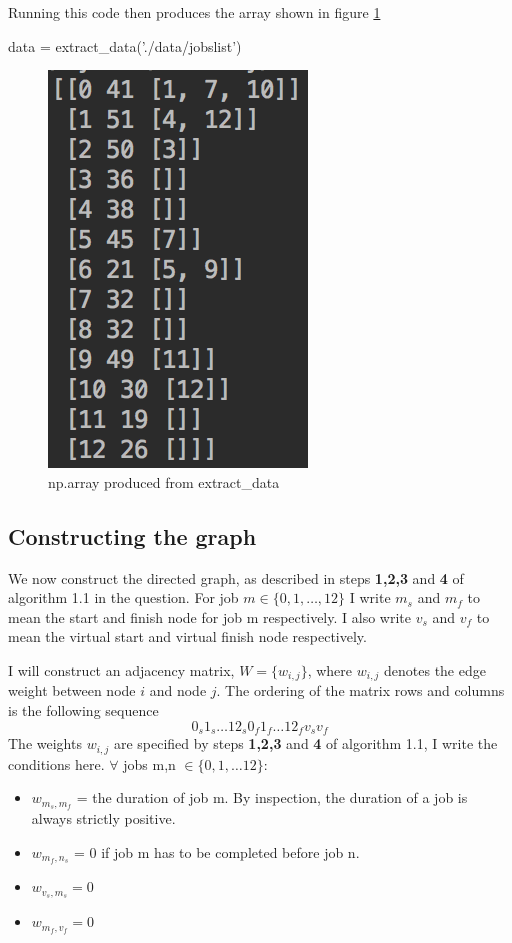 \documentclass[paper=a4, fontsize=12pt]{scrartcl} %
\numberwithin{equation}{section}       %
\numberwithin{figure}{section}         %
\numberwithin{table}{section}          %
\begin{document}
Running this code then produces the array shown in figure \ref{data}
\begin{python}
data = extract_data('./data/jobslist')
\end{python}

\begin{figure}[t]\label{data}
\caption{np.array produced from extract\_data}
\centering
\includegraphics{data}
\end{figure}

\subsection{Constructing the graph}
We now construct the directed graph, as described in steps \textbf{1,2,3} and \textbf{4} of algorithm 1.1 in the question. For job $m \in \{ 0,1,\dots, 12 \}$ I write $m_{s}$ and $m_{f}$ to mean the start and finish node for job m respectively. I also write $v_{s}$ and $v_{f}$ to mean the virtual start and virtual finish node respectively.

I will construct an adjacency matrix, $W = \{ w_{i,j} \}$, where $w_{i,j}$ denotes the edge weight between node $i$ and node $j$. The ordering of the matrix rows and columns is the following sequence $$ 0_{s} 1_{s} \dots 12_{s} 0_{f} 1_{f} \dots 12_{f} v_{s} v_{f}$$
The weights $w_{i,j}$ are specified by steps \textbf{1,2,3} and \textbf{4} of algorithm 1.1, I write the conditions here. $\forall$ jobs m,n $\in \{ 0,1,\dots 12\}$:
\begin{itemize}
  \item $w_{m_{s},m_{f}}$ = the duration of job m. By inspection, the duration of a job is always strictly positive.
  \item $w_{m_{f},n_{s}}$ = 0 if job m has to be completed before job n.
  \item $w_{v_{s},m_{s}} = 0$
  \item $w_{m_{f},v_{f}} = 0$
\end{itemize}
\end{document}
